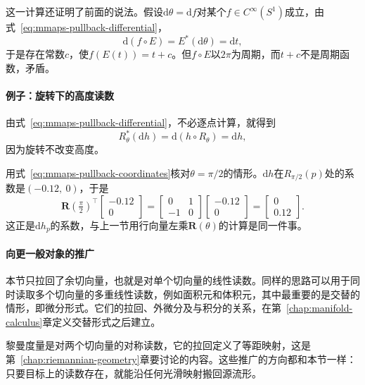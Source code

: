 这一计算还证明了前面的说法。假设$\mathrm d\theta=\mathrm df$对某个$f\in C^\infty(S^1)$成立，由式~\eqref{eq:mmaps-pullback-differential}，
\[
\mathrm d(f\circ E)=E^*(\mathrm d\theta)=\mathrm dt ,
\]
于是存在常数$c$，使$f(E(t))=t+c$。但$f\circ E$以$2\pi$为周期，而$t+c$不是周期函数，矛盾。

\paragraph{例子：旋转下的高度读数}
由式~\eqref{eq:mmaps-pullback-differential}，不必逐点计算，就得到
\[
R_\theta^*(\mathrm dh)=\mathrm d(h\circ R_\theta)=\mathrm dh ,
\]
因为旋转不改变高度。

用式~\eqref{eq:mmaps-pullback-coordinates}核对$\theta=\pi/2$的情形。$\mathrm dh$在$R_{\pi/2}(p)$处的系数是$(-0.12,\ 0)$，于是
\[
\bm R(\tfrac\pi2)^\top\begin{bmatrix}-0.12\\0\end{bmatrix}
=\begin{bmatrix}0&1\\-1&0\end{bmatrix}\begin{bmatrix}-0.12\\0\end{bmatrix}
=\begin{bmatrix}0\\0.12\end{bmatrix}.
\]
这正是$\mathrm dh_p$的系数，与上一节用行向量左乘$\bm R(\theta)$的计算是同一件事。

\paragraph{向更一般对象的推广}
本节只拉回了余切向量，也就是对单个切向量的线性读数。同样的思路可以用于同时读取多个切向量的多重线性读数，例如面积元和体积元，其中最重要的是交替的情形，即微分形式。它们的拉回、外微分及与积分的关系，在第~\ref{chap:manifold-calculus}章定义交替形式之后建立。

黎曼度量是对两个切向量的对称读数，它的拉回定义了等距映射，这是第~\ref{chap:riemannian-geometry}章要讨论的内容。这些推广的方向都和本节一样：只要目标上的读数存在，就能沿任何光滑映射搬回源流形。
